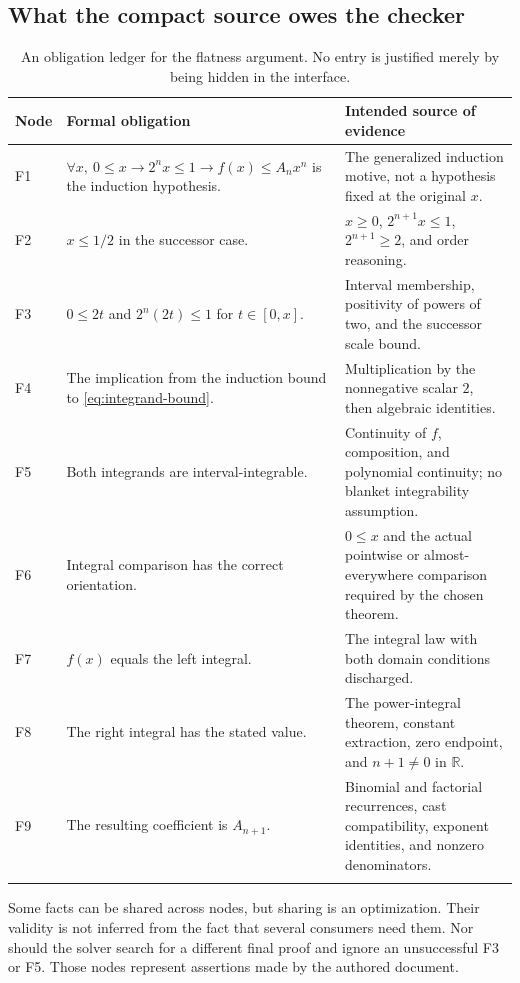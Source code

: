 \documentclass[11pt,a4paper]{article}
\newcommand{\R}{\mathbb R}
\theoremstyle{definition}
\theoremstyle{remark}
\begin{document}
\subsection{What the compact source owes the checker}
\begin{longtable}{@{}L{.10\linewidth}L{.35\linewidth}L{.47\linewidth}@{}}
\toprule
Node & Formal obligation & Intended source of evidence\\
\midrule\endhead
F1 & $\forall x,\ 0\le x\to2^nx\le1\to f(x)\le A_nx^n$ is the induction hypothesis. & The generalized induction motive, not a hypothesis fixed at the original $x$.\\
F2 & $x\le1/2$ in the successor case. & $x\ge0$, $2^{n+1}x\le1$, $2^{n+1}\ge2$, and order reasoning.\\
F3 & $0\le2t$ and $2^n(2t)\le1$ for $t\in[0,x]$. & Interval membership, positivity of powers of two, and the successor scale bound.\\
F4 & The implication from the induction bound to \eqref{eq:integrand-bound}. & Multiplication by the nonnegative scalar $2$, then algebraic identities.\\
F5 & Both integrands are interval-integrable. & Continuity of $f$, composition, and polynomial continuity; no blanket integrability assumption.\\
F6 & Integral comparison has the correct orientation. & $0\le x$ and the actual pointwise or almost-everywhere comparison required by the chosen theorem.\\
F7 & $f(x)$ equals the left integral. & The integral law with both domain conditions discharged.\\
F8 & The right integral has the stated value. & The power-integral theorem, constant extraction, zero endpoint, and $n+1\ne0$ in $\R$.\\
F9 & The resulting coefficient is $A_{n+1}$. & Binomial and factorial recurrences, cast compatibility, exponent identities, and nonzero denominators.\\
\bottomrule
\caption{An obligation ledger for the flatness argument. No entry is justified merely by being hidden in the interface.}
\end{longtable}

Some facts can be shared across nodes, but sharing is an optimization. Their validity is not inferred from the fact that several consumers need them. Nor should the solver search for a different final proof and ignore an unsuccessful F3 or F5. Those nodes represent assertions made by the authored document.
\end{document}

